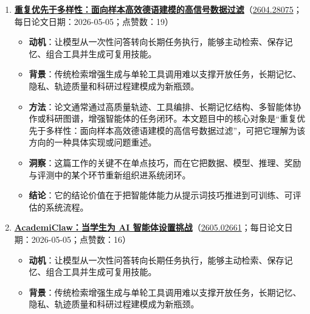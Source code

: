 \begin{enumerate}[leftmargin=1.5em]
\begin{itemize}[leftmargin=1.5em]
    \item \textbf{背景}：传统检索增强生成与单轮工具调用难以支撑开放任务，长期记忆、隐私、轨迹质量和科研过程建模成为新瓶颈。
    \item \textbf{方法}：论文通常通过高质量轨迹、工具编排、长期记忆结构、多智能体协作或科研图谱，增强智能体的任务闭环。本文题目中的核心对象是“从上下文到技能：语言模型能否从上下文中学会技能”，可把它理解为该方向的一种具体实现或问题重述。
    \item \textbf{洞察}：这篇工作的关键不在单点技巧，而在它把数据、模型、推理、奖励与评测中的某个环节重新组织进系统闭环。
    \item \textbf{结论}：它的结论价值在于把智能体能力从提示词技巧推进到可训练、可评估的系统流程。
  \end{itemize}
  \item \textbf{\href{https://huggingface.co/papers/2604.28075}{重复优先于多样性：面向样本高效德语建模的高信号数据过滤}}（\href{https://arxiv.org/abs/2604.28075}{2604.28075}；每日论文日期：2026-05-05；点赞数：19）
  \begin{itemize}[leftmargin=1.5em]
    \item \textbf{动机}：让模型从一次性问答转向长期任务执行，能够主动检索、保存记忆、组合工具并生成可复用技能。
    \item \textbf{背景}：传统检索增强生成与单轮工具调用难以支撑开放任务，长期记忆、隐私、轨迹质量和科研过程建模成为新瓶颈。
    \item \textbf{方法}：论文通常通过高质量轨迹、工具编排、长期记忆结构、多智能体协作或科研图谱，增强智能体的任务闭环。本文题目中的核心对象是“重复优先于多样性：面向样本高效德语建模的高信号数据过滤”，可把它理解为该方向的一种具体实现或问题重述。
    \item \textbf{洞察}：这篇工作的关键不在单点技巧，而在它把数据、模型、推理、奖励与评测中的某个环节重新组织进系统闭环。
    \item \textbf{结论}：它的结论价值在于把智能体能力从提示词技巧推进到可训练、可评估的系统流程。
  \end{itemize}
  \item \textbf{\href{https://huggingface.co/papers/2605.02661}{AcademiClaw：当学生为 AI 智能体设置挑战}}（\href{https://arxiv.org/abs/2605.02661}{2605.02661}；每日论文日期：2026-05-05；点赞数：16）
  \begin{itemize}[leftmargin=1.5em]
    \item \textbf{动机}：让模型从一次性问答转向长期任务执行，能够主动检索、保存记忆、组合工具并生成可复用技能。
    \item \textbf{背景}：传统检索增强生成与单轮工具调用难以支撑开放任务，长期记忆、隐私、轨迹质量和科研过程建模成为新瓶颈。

\end{itemize}
\end{enumerate}
